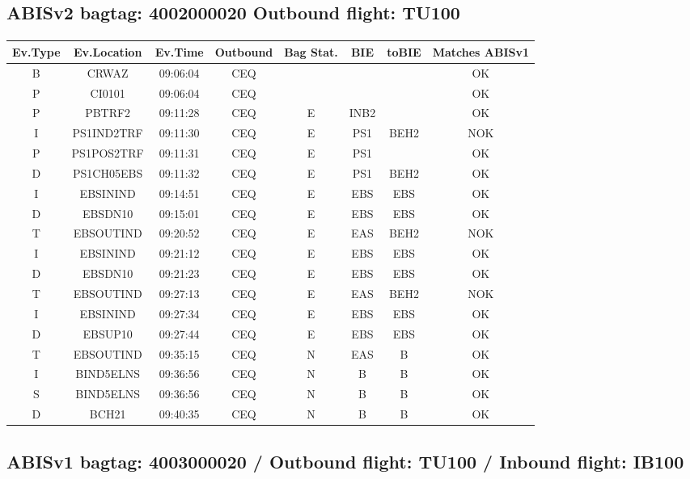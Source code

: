 \documentclass{report}
\begin{document}
\subsection*{ABISv2 bagtag: 4002000020 Outbound flight: TU100}
\paragraph{}
\begin{longtable}{cccccccc}    \toprule
\rowcolor{white!50}
\textbf{Ev.Type} & \textbf{Ev.Location} & \textbf{Ev.Time} & \textbf{Outbound} & \textbf{Bag Stat.} & \textbf{BIE} & \textbf{toBIE} & \textbf{Matches ABISv1} \\\midrule
B & CRWAZ & 09:06:04  & CEQ &  &  &  & OK\\
P & CI0101 & 09:06:04  & CEQ &  &  &  & OK\\
P & PBTRF2 & 09:11:28  & CEQ & E & INB2 &  & OK\\
I & PS1IND2TRF & 09:11:30  & CEQ & E & PS1 & BEH2 & NOK\\
P & PS1POS2TRF & 09:11:31  & CEQ & E & PS1 &  & OK\\
D & PS1CH05EBS & 09:11:32  & CEQ & E & PS1 & BEH2 & OK\\
I & EBSININD & 09:14:51  & CEQ & E & EBS & EBS & OK\\
D & EBSDN10 & 09:15:01  & CEQ & E & EBS & EBS & OK\\
T & EBSOUTIND & 09:20:52  & CEQ & E & EAS & BEH2 & NOK\\
I & EBSININD & 09:21:12  & CEQ & E & EBS & EBS & OK\\
D & EBSDN10 & 09:21:23  & CEQ & E & EBS & EBS & OK\\
T & EBSOUTIND & 09:27:13  & CEQ & E & EAS & BEH2 & NOK\\
I & EBSININD & 09:27:34  & CEQ & E & EBS & EBS & OK\\
D & EBSUP10 & 09:27:44  & CEQ & E & EBS & EBS & OK\\
T & EBSOUTIND & 09:35:15  & CEQ & N & EAS & B & OK\\
I & BIND5ELNS & 09:36:56  & CEQ & N & B & B & OK\\
S & BIND5ELNS & 09:36:56  & CEQ & N & B & B & OK\\
D & BCH21 & 09:40:35  & CEQ & N & B & B & OK\\
\bottomrule
\end{longtable}
\subsection*{ABISv1 bagtag: 4003000020 / Outbound flight: TU100 / Inbound flight: IB100}
\end{document}
